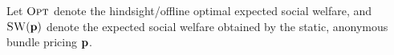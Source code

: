 \vspace{0.1in}
\noindent
Let ${\normalfont\textsc{Opt}}$ denote the hindsight/offline optimal expected social welfare, and
${\normalfont\textsc{SW}}(\mathbf{p})$ denote the expected social welfare obtained by the
static, anonymous bundle pricing $\mathbf{p}$.




